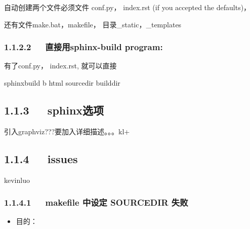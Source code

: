 \documentclass[letterpaper,12pt,english]{sphinxmanual}
\begin{document}
自动创建两个文件必须文件
conf.py， index.rst (if you accepted the defaults)，

还有文件make.bat，makefile， 目录\_static，\_templates


\subsubsection{1.1.2.2   直接用sphinx-build program:}
\label{\detokenize{001software/001install/sphinx:sphinx-build-program}}
有了conf.py， index.rst, 就可以直接

\begin{sphinxVerbatim}[commandchars=\\\{\}]
\PYGZdl{} sphinx\PYGZhy{}build \PYGZhy{}b html sourcedir builddir
\end{sphinxVerbatim}


\subsection{1.1.3   sphinx选项}
\label{\detokenize{001software/001install/sphinx:id3}}
引入graphviz???要加入详细描述。。。kl+



\subsection{1.1.4   issues}
\label{\detokenize{001software/001install/sphinx:issues}}
kevinluo


\subsubsection{1.1.4.1   makefile 中设定 SOURCEDIR 失败}
\label{\detokenize{001software/001install/sphinx:makefile-sourcedir}}\begin{itemize}
\item {} 
目的：

\end{itemize}
\end{document}
